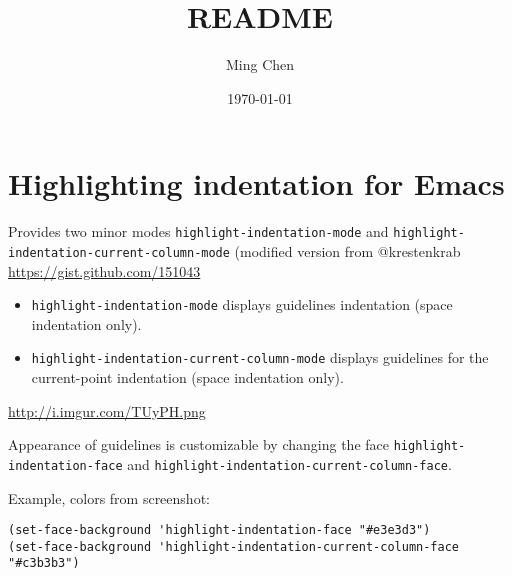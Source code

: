 \documentclass[11pt]{article}
\title{README}
\author{Ming Chen}
\date{\today}
\begin{document}
\maketitle

\setcounter{tocdepth}{3}
\tableofcontents
\vspace*{1cm}
\section{Highlighting indentation for Emacs}
\label{sec-1}

  Provides two minor modes \texttt{highlight-indentation-mode} and
  \texttt{highlight-indentation-current-column-mode} (modified version from
  @krestenkrab \href{https://gist.github.com/151043}{https://gist.github.com/151043}

\begin{itemize}
\item \texttt{highlight-indentation-mode} displays guidelines indentation
    (space indentation only).
\item \texttt{highlight-indentation-current-column-mode} displays guidelines for
    the current-point indentation (space indentation only).
\end{itemize}
    
  \href{http://i.imgur.com/TUyPH.png}{http://i.imgur.com/TUyPH.png}

  Appearance of guidelines is customizable by changing the face
  \texttt{highlight-indentation-face} and
  \texttt{highlight-indentation-current-column-face}.

  Example, colors from screenshot:

\begin{verbatim}
(set-face-background 'highlight-indentation-face "#e3e3d3")
(set-face-background 'highlight-indentation-current-column-face "#c3b3b3")
\end{verbatim}
\end{document}
